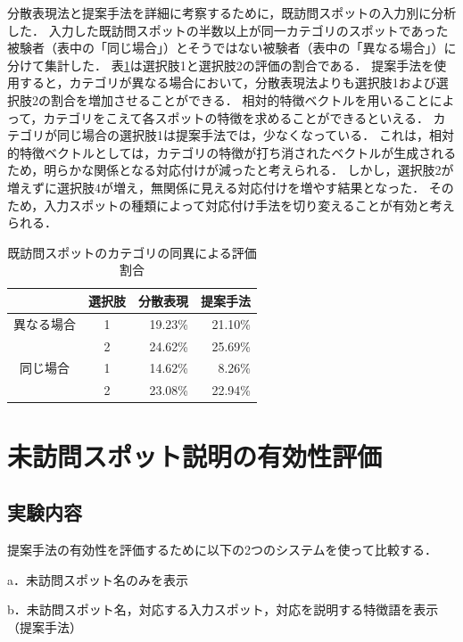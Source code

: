 \documentclass[submit]{ipsj}
\begin{document}
分散表現法と提案手法を詳細に考察するために，既訪問スポットの入力別に分析した．
入力した既訪問スポットの半数以上が同一カテゴリのスポットであった被験者（表中の「同じ場合」）とそうではない被験者（表中の「異なる場合」）に分けて集計した．
表\ref{table:既訪問スポットのカテゴリの同異による評価割合}は選択肢1と選択肢2の評価の割合である．
提案手法を使用すると，カテゴリが異なる場合において，分散表現法よりも選択肢1および選択肢2の割合を増加させることができる．
相対的特徴ベクトルを用いることによって，カテゴリをこえて各スポットの特徴を求めることができるといえる．
カテゴリが同じ場合の選択肢1は提案手法では，少なくなっている．
これは，相対的特徴ベクトルとしては，カテゴリの特徴が打ち消されたベクトルが生成されるため，明らかな関係となる対応付けが減ったと考えられる．
しかし，選択肢2が増えずに選択肢4が増え，無関係に見える対応付けを増やす結果となった．
そのため，入力スポットの種類によって対応付け手法を切り変えることが有効と考えられる．

\begin{table}[t]
  \caption{既訪問スポットのカテゴリの同異による評価割合}
  \label{table:既訪問スポットのカテゴリの同異による評価割合}
  \centering
  \begin{tabular}{c|c|r|r}
  \hline  \hline
  & 選択肢 & \multicolumn{1}{c|}{分散表現} & \multicolumn{1}{c}{提案手法} \\ \hline
  異なる場合                 & 1   & 19.23\%                  & 21.10\%                 \\ \cline{2-4}
  & 2   & 24.62\%                  & 25.69\%                 \\ \hline
  同じ場合                  & 1   & 14.62\%                  & 8.26\%                  \\ \cline{2-4}
  \multicolumn{1}{l|}{} & 2   & 23.08\%                  & 22.94\%                 \\ \hline
  \end{tabular}
\end{table}

\section{未訪問スポット説明の有効性評価}
\label{sec:未訪問スポット説明の有効性評価}
\subsection{実験内容}
提案手法の有効性を評価するために以下の2つのシステムを使って比較する．
\begin{description}
  \item a．未訪問スポット名のみを表示
  \item b．未訪問スポット名，対応する入力スポット，対応を説明する特徴語を表示（提案手法）
\end{description}
\end{document}

